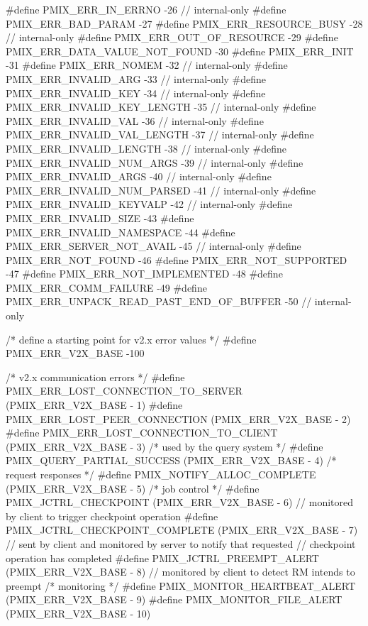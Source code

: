 \begin{codepar}
#define PMIX_ERR_IN_ERRNO                           -26         // internal-only
#define PMIX_ERR_BAD_PARAM                          -27
#define PMIX_ERR_RESOURCE_BUSY                      -28         // internal-only
#define PMIX_ERR_OUT_OF_RESOURCE                    -29
#define PMIX_ERR_DATA_VALUE_NOT_FOUND               -30
#define PMIX_ERR_INIT                               -31
#define PMIX_ERR_NOMEM                              -32         // internal-only
#define PMIX_ERR_INVALID_ARG                        -33         // internal-only
#define PMIX_ERR_INVALID_KEY                        -34         // internal-only
#define PMIX_ERR_INVALID_KEY_LENGTH                 -35         // internal-only
#define PMIX_ERR_INVALID_VAL                        -36         // internal-only
#define PMIX_ERR_INVALID_VAL_LENGTH                 -37         // internal-only
#define PMIX_ERR_INVALID_LENGTH                     -38         // internal-only
#define PMIX_ERR_INVALID_NUM_ARGS                   -39         // internal-only
#define PMIX_ERR_INVALID_ARGS                       -40         // internal-only
#define PMIX_ERR_INVALID_NUM_PARSED                 -41         // internal-only
#define PMIX_ERR_INVALID_KEYVALP                    -42         // internal-only
#define PMIX_ERR_INVALID_SIZE                       -43
#define PMIX_ERR_INVALID_NAMESPACE                  -44
#define PMIX_ERR_SERVER_NOT_AVAIL                   -45         // internal-only
#define PMIX_ERR_NOT_FOUND                          -46
#define PMIX_ERR_NOT_SUPPORTED                      -47
#define PMIX_ERR_NOT_IMPLEMENTED                    -48
#define PMIX_ERR_COMM_FAILURE                       -49
#define PMIX_ERR_UNPACK_READ_PAST_END_OF_BUFFER     -50         // internal-only

/* define a starting point for v2.x error values */
#define PMIX_ERR_V2X_BASE                   -100

/* v2.x communication errors */
#define PMIX_ERR_LOST_CONNECTION_TO_SERVER      (PMIX_ERR_V2X_BASE -  1)
#define PMIX_ERR_LOST_PEER_CONNECTION           (PMIX_ERR_V2X_BASE -  2)
#define PMIX_ERR_LOST_CONNECTION_TO_CLIENT      (PMIX_ERR_V2X_BASE -  3)
/* used by the query system */
#define PMIX_QUERY_PARTIAL_SUCCESS              (PMIX_ERR_V2X_BASE -  4)
/* request responses */
#define PMIX_NOTIFY_ALLOC_COMPLETE              (PMIX_ERR_V2X_BASE -  5)
/* job control */
#define PMIX_JCTRL_CHECKPOINT                   (PMIX_ERR_V2X_BASE -  6)    // monitored by client to trigger checkpoint operation
#define PMIX_JCTRL_CHECKPOINT_COMPLETE          (PMIX_ERR_V2X_BASE -  7)    // sent by client and monitored by server to notify that requested
                                                                            //     checkpoint operation has completed
#define PMIX_JCTRL_PREEMPT_ALERT                (PMIX_ERR_V2X_BASE -  8)    // monitored by client to detect RM intends to preempt
/* monitoring */
#define PMIX_MONITOR_HEARTBEAT_ALERT            (PMIX_ERR_V2X_BASE -  9)
#define PMIX_MONITOR_FILE_ALERT                 (PMIX_ERR_V2X_BASE - 10)


\end{codepar}
